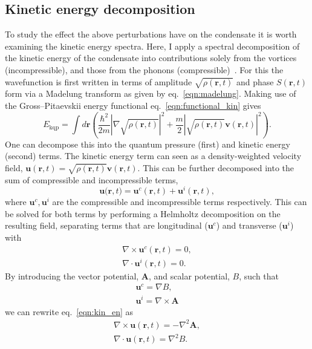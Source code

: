 \subsection{Kinetic energy decomposition}

To study the effect the above perturbations have on the condensate it is worth examining the kinetic energy spectra. Here, I apply a spectral decomposition of the kinetic energy of the condensate into contributions solely from the vortices (incompressible), and those from the phonons (compressible)~\cite{CT:Nore_prl_1997,CT:Nore_pof_1997,CT:Bradley_prx_2012}. For this the wavefunction is first written in terms of amplitude $\sqrt{\rho(\mathbf{r},t)}$ and phase $S(\mathbf{r},t)$ form via a Madelung transform as given by eq.~\ref{eqn:madelung}. Making use of the Gross--Pitaevskii energy functional eq.~\ref{eqn:functional_kin} gives
\begin{equation}
    E_{\text{kqp}} = \int d\mathbf{r} \left( \frac{\hbar^2}{2m}| \nabla\sqrt{\rho(\mathbf{r},t)} |^2  + \frac{m}{2}|\sqrt{\rho(\mathbf{r},t)}\mathbf{v}(\mathbf{r},t) |^2\right).
\end{equation}
One can decompose this into the quantum pressure (first) and kinetic energy (second) terms. The kinetic energy term can seen as a density-weighted velocity field, $\mathbf{u}(\mathbf{r},t) = \sqrt{\rho(\mathbf{r},t)}\mathbf{v}(\mathbf{r},t)$. This can be further decomposed into the sum of compressible and incompressible terms,
\begin{equation}\label{eqn:kin_en}
    \mathbf{u(r},t) = \mathbf{u}^c(\mathbf{r},t) + \mathbf{u}^i(\mathbf{r},t),
\end{equation}
where $\mathbf{u}^c, \mathbf{u}^i$ are the compressible and incompressible terms respectively. This can be solved for both terms by performing a Helmholtz decomposition on the resulting field, separating terms that are longitudinal ($\mathbf{u}^c$) and transverse ($\mathbf{u}^i$) with
\begin{subequations}\label{eqn:kinterms}
\begin{align}
    \nabla \times \mathbf{u}^c(\mathbf{r},t) = 0, \\
    \nabla \cdot \mathbf{u}^i(\mathbf{r},t) = 0.
\end{align}
\end{subequations}
By introducing the vector potential, $\mathbf{A}$, and scalar potential, $B$, such that
\begin{subequations}
\begin{align}
    \mathbf{u}^c = \nabla B, \\
    \mathbf{u}^i = \nabla \times \mathbf{A}
\end{align}
\end{subequations}
we can rewrite eq.~\ref{eqn:kin_en} as
\begin{align}
    \nabla \times \mathbf{u}(\mathbf{r},t) = -\nabla^2 \mathbf{A}, \\
    \nabla \cdot \mathbf{u}(\mathbf{r},t) = \nabla^2 {B}.
\end{align}

